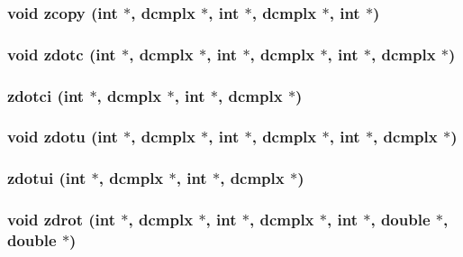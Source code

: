 \subsubsection{\setlength{\rightskip}{0pt plus 5cm}void zcopy (int $\ast$, {\bf dcmplx} $\ast$, int $\ast$, {\bf dcmplx} $\ast$, int $\ast$)}\label{essl_8h_8669f5f74ad77c62b8db360f60cc9995}


\subsubsection{\setlength{\rightskip}{0pt plus 5cm}void zdotc (int $\ast$, {\bf dcmplx} $\ast$, int $\ast$, {\bf dcmplx} $\ast$, int $\ast$, {\bf dcmplx} $\ast$)}\label{essl_8h_5f8bca5c3a4d482227ca255a9acafab7}


\subsubsection{ zdotci (int $\ast$, {\bf dcmplx} $\ast$, int $\ast$, {\bf dcmplx} $\ast$)}\label{essl_8h_d44690b82a6299d148eab5eca4c7bf28}


\subsubsection{\setlength{\rightskip}{0pt plus 5cm}void zdotu (int $\ast$, {\bf dcmplx} $\ast$, int $\ast$, {\bf dcmplx} $\ast$, int $\ast$, {\bf dcmplx} $\ast$)}\label{essl_8h_fc11d086c4650d1c0448b2a2c205d87f}


\subsubsection{ zdotui (int $\ast$, {\bf dcmplx} $\ast$, int $\ast$, {\bf dcmplx} $\ast$)}\label{essl_8h_a5d416da2e31eafbdb078e750212bb08}


\subsubsection{\setlength{\rightskip}{0pt plus 5cm}void zdrot (int $\ast$, {\bf dcmplx} $\ast$, int $\ast$, {\bf dcmplx} $\ast$, int $\ast$, double $\ast$, double $\ast$)}\label{essl_8h_ea9fb70a45ec1055a517afc9fcf21363}


